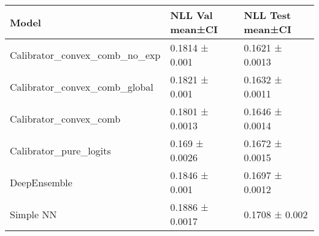 \begin{tabular}{lll}
\toprule
Model & NLL Val mean±CI & NLL Test mean±CI \\
\midrule
Calibrator_convex_comb_no_exp & 0.1814 ± 0.001 & 0.1621 ± 0.0013 \\
Calibrator_convex_comb_global & 0.1821 ± 0.001 & 0.1632 ± 0.0011 \\
Calibrator_convex_comb & 0.1801 ± 0.0013 & 0.1646 ± 0.0014 \\
Calibrator_pure_logits & 0.169 ± 0.0026 & 0.1672 ± 0.0015 \\
DeepEnsemble & 0.1846 ± 0.001 & 0.1697 ± 0.0012 \\
Simple NN & 0.1886 ± 0.0017 & 0.1708 ± 0.002 \\
\bottomrule
\end{tabular}
